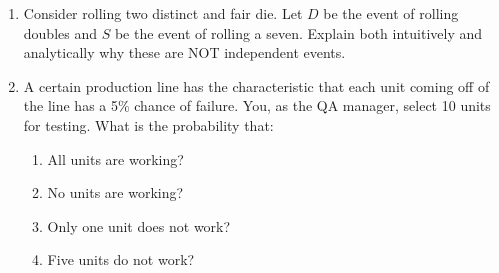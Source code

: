 \documentclass[letterpaper,12pt,fleqn]{article}
\begin{document}
\begin{enumerate}[left=0in,itemsep=0.5in]
\item Consider rolling two distinct and fair die.  Let \(D\) be the event of rolling doubles and \(S\) be the
  event of rolling a seven.  Explain both intuitively and analytically why these are NOT independent events.

\item A certain production line has the characteristic that each unit coming off of the line has a 5\% chance of
  failure.  You, as the QA manager, select 10 units for testing.  What is the probability that:
  \begin{enumerate}
  \item All units are working?
  \item No units are working?
  \item Only one unit does not work?
  \item Five units do not work?
  \end{enumerate}
\end{enumerate}
\end{document}
